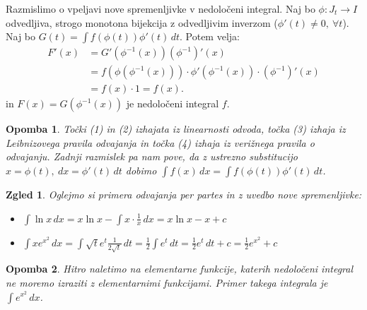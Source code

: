 \documentclass[10pt, a4paper]{article}
\newtheorem*{opomba}{Opomba}
\newtheorem{zgled}{Zgled}[section]
\begin{document}
    Razmislimo o vpeljavi nove spremenljivke v nedoločeni integral.
    Naj bo $\phi: J_t \rightarrow I$ odvedljiva, strogo monotona bijekcija z odvedljivim inverzom ($\phi'(t) \neq 0,\ \forall t$).
    Naj bo $G(t) = \int f(\phi (t)) \phi'(t)\,dt$. Potem velja:
    \begin{align*}
        F'(x) &= G'(\phi^{-1} (x)) (\phi^{-1})' (x)\\
        &= f(\phi (\phi^{-1} (x))) \cdot \phi'(\phi^{-1}(x)) \cdot (\phi^{-1})'(x)\\
        &= f(x) \cdot 1 = f(x).
    \end{align*} 
    in $F(x) = G(\phi^{-1} (x))$ je nedoločeni integral $f$.

\begin{opomba}
    Točki (1) in (2) izhajata iz linearnosti odvoda, točka (3) izhaja iz Leibnizovega pravila odvajanja in točka (4) izhaja iz verižnega pravila o odvajanju.
    Zadnji razmislek pa nam pove, da z ustrezno substitucijo $x = \phi(t),\ dx = \phi'(t)\,dt$ dobimo $\int f(x)\,dx = \int f(\phi(t)) \phi'(t)\,dt$.
\end{opomba}

\begin{zgled}
    Oglejmo si primera odvajanja per partes in z uvedbo nove spremenljivke:
    \begin{itemize}
        \item $\int \ln x\,dx = x \ln x - \int x \cdot \frac{1}{x}\,dx = x \ln x - x + c$
        \item $\int x e^{x^2}\,dx = \int \sqrt{t} e^t \frac{1}{2 \sqrt{t}}\,dt = \frac{1}{2} \int e^t\,dt = \frac{1}{2} e^t\,dt + c= \frac{1}{2}e^{x^2} + c$
    \end{itemize}
\end{zgled}

\begin{opomba}
    Hitro naletimo na elementarne funkcije, katerih nedoločeni integral ne moremo izraziti z elementarnimi funkcijami.
    Primer takega integrala je $\int e^{x^2}\,dx$.
\end{opomba}
\end{document}
